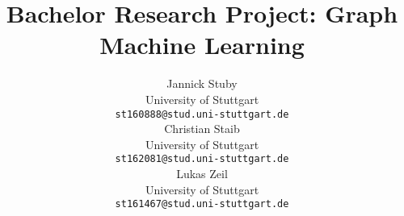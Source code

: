 \documentclass{article}
\title{Bachelor Research Project: Graph Machine Learning}
\author{%
  Jannick Stuby \\
  University of Stuttgart\\
  \texttt{st160888@stud.uni-stuttgart.de} \\
  \And
  Christian Staib\\
  University of Stuttgart\\
  \texttt{st162081@stud.uni-stuttgart.de} \\
  \AND
  Lukas Zeil \\
  University of Stuttgart\\
  \texttt{st161467@stud.uni-stuttgart.de} \\
}
\begin{document}
\maketitle








{
  \small
  \printbibliography
}
\end{document}
